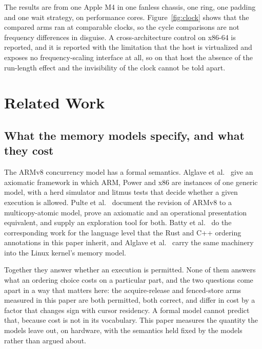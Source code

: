 \documentclass[conference]{IEEEtran}
\begin{document}
The results are from one Apple M4 in one fanless chassis, one ring, one padding
and one wait strategy, on performance cores. Figure~\ref{fig:clock} shows that the compared arms
ran at comparable clocks, so the cycle comparisons are not frequency
differences in disguise. A cross-architecture control on
x86-64 is reported, and it is reported with the limitation that the host is
virtualized and exposes no frequency-scaling interface at all, so on that host
the absence of the run-length effect and the invisibility of the clock cannot
be told apart.

\section{Related Work}

\subsection{What the memory models specify, and what they cost}

The ARMv8 concurrency model has a formal semantics. Alglave et
al.~\cite{alglave2014herding} give an axiomatic framework in which ARM, Power
and x86 are instances of one generic model, with a herd simulator and litmus
tests that decide whether a given execution is allowed. Pulte et
al.~\cite{pulte2018simplifying} document the revision of ARMv8 to a
multicopy-atomic model, prove an axiomatic and an operational presentation
equivalent, and supply an exploration tool for both. Batty et
al.~\cite{batty2011mathematizing} do the corresponding work for the language
level that the Rust and C++ ordering annotations in this paper inherit, and
Alglave et al.~\cite{alglave2018frightening} carry the same machinery into the
Linux kernel's memory model.

Together they answer whether an execution is permitted. None of them answers
what an ordering choice costs on a particular part, and the two questions come
apart in a way that matters here: the acquire-release and fenced-store arms
measured in this paper are both permitted, both correct, and differ in cost by a
factor that changes sign with cursor residency. A formal model cannot predict
that, because cost is not in its vocabulary. This paper measures the quantity
the models leave out, on hardware, with the semantics held fixed by the models
rather than argued about.
\end{document}
